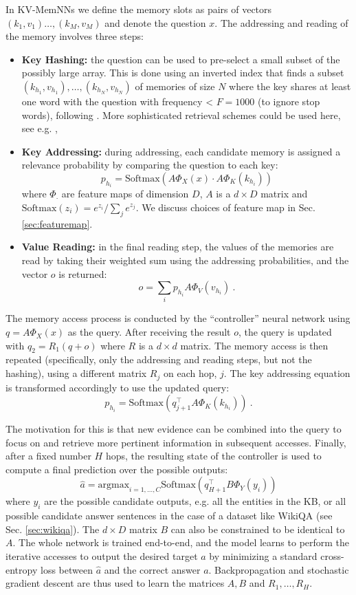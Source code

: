 In KV-MemNNs we define  the memory slots as pairs of vectors $(k_1, v_1)\dots, (k_M, v_M)$
and denote the question $x$.
The addressing and reading of the memory
 involves three steps:
\begin{itemize}
\item {\bf Key Hashing:}
 the question can be
 used to pre-select a small subset of the possibly large array. This is done
using an inverted index that finds a subset $(k_{h_1},v_{h_1}), \dots, (k_{h_N},v_{h_N})$
 of memories of size $N$ where the key shares at
least one word with the question with frequency < $F=1000$ (to ignore stop words),
 following \cite{dodge2015evaluating}.
More sophisticated
retrieval schemes could be used here, see e.g. \cite{manning2008introduction},
\item {\bf Key Addressing:} during addressing, each candidate memory is assigned a relevance probability by comparing the question to each key:
\[
  p_{h_i} =  \text{Softmax}(A\Phi_X(x) \cdot A\Phi_K(k_{h_i}))
\]
where $\Phi_{\cdot}$ are feature maps of dimension $D$, $A$ is a $d \times D$ matrix
and  $\text{Softmax}(z_i) = e^{z_i} / \sum_j e^{z_j}$.
We discuss choices of feature map in Sec. \ref{sec:featuremap}.

\item {\bf Value Reading:} in the final reading step, the values of the memories are read by taking their weighted sum using the addressing probabilities, and the vector $o$ is returned:
\[
       o = \sum_i p_{h_i}  A\Phi_V(v_{h_i})~.
\]
\end{itemize}

The memory access process is conducted  by the ``controller'' neural network
 using $q = A \Phi_X(x)$ as the query.
After receiving the result $o$, the query is updated with $q_2 = R_1(q + o)$ where $R$ is a $d \times d$ matrix. The memory access is then repeated (specifically, only the addressing and reading steps, but not the hashing), using a different matrix $R_{j}$ on each hop, $j$. The key addressing equation is transformed accordingly to use the updated query:
\[
  p_{h_i} =  \text{Softmax}(q_{j+1}^\top A\Phi_K(k_{h_i}))~.
\]

The motivation for this is that new evidence can be combined into the query to focus on and
retrieve more pertinent information in subsequent accesses.
Finally, after a fixed number $H$ hops, the resulting state of the controller is used to compute a final prediction over the possible outputs:
\[
    \hat{a} = \text{argmax}_{i={1,\dots,C}} \text{Softmax}(q_{H+1}^\top B \Phi_Y(y_i))
\]
where $y_i$ are the possible candidate outputs, e.g. all the entities in the KB,
or all possible candidate answer sentences in the case of a dataset like {\sc WikiQA}
(see Sec. \ref{sec:wikiqa}).
The $d \times D$ matrix $B$ can also be constrained to be identical to $A$.
 The whole network is trained end-to-end, and the model
learns to perform the iterative accesses to output the desired target $a$
 by minimizing a standard cross-entropy
loss between $\hat{a}$ and the correct answer $a$.
Backpropagation and stochastic gradient descent are thus used to learn the matrices
$A, B$ and $R_1, \dots, R_H$.


